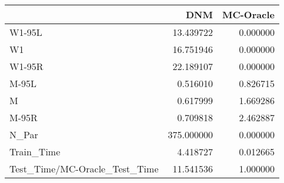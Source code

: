 \begin{tabular}{lrr}
\toprule
{} &         DNM &  MC-Oracle \\
\midrule
W1-95L                        &   13.439722 &   0.000000 \\
W1                            &   16.751946 &   0.000000 \\
W1-95R                        &   22.189107 &   0.000000 \\
M-95L                         &    0.516010 &   0.826715 \\
M                             &    0.617999 &   1.669286 \\
M-95R                         &    0.709818 &   2.462887 \\
N\_Par                         &  375.000000 &   0.000000 \\
Train\_Time                    &    4.418727 &   0.012665 \\
Test\_Time/MC-Oracle\_Test\_Time &   11.541536 &   1.000000 \\
\bottomrule
\end{tabular}
